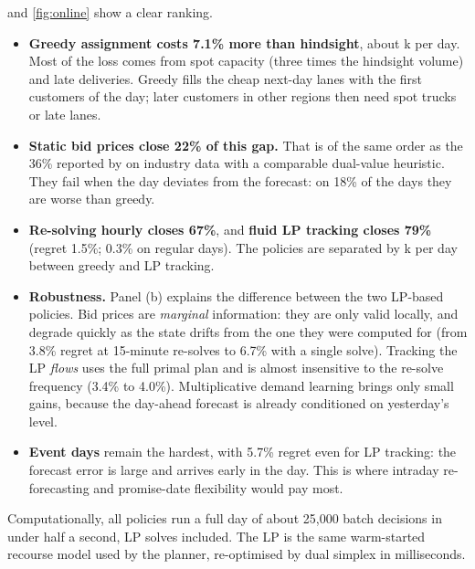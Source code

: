  and \cref{fig:online} show a clear ranking.
\begin{itemize}
  \item \textbf{Greedy assignment costs 7.1\% more than hindsight}, about k per day. Most of the loss comes from spot capacity (three times the hindsight volume) and late deliveries. Greedy fills the cheap next-day lanes with the first customers of the day; later customers in other regions then need spot trucks or late lanes.
  \item \textbf{Static bid prices close 22\% of this gap.} That is of the same order as the 36\% reported by \citet{acimovic2015} on industry data with a comparable dual-value heuristic. They fail when the day deviates from the forecast: on 18\% of the days they are worse than greedy.
  \item \textbf{Re-solving hourly closes 67\%}, and \textbf{fluid LP tracking closes 79\%} (regret 1.5\%; 0.3\% on regular days). The policies are separated by k per day between greedy and LP tracking.
  \item \textbf{Robustness.} Panel (b) explains the difference between the two LP-based policies. Bid prices are \emph{marginal} information: they are only valid locally, and degrade quickly as the state drifts from the one they were computed for (from 3.8\% regret at 15-minute re-solves to 6.7\% with a single solve). Tracking the LP \emph{flows} uses the full primal plan and is almost insensitive to the re-solve frequency (3.4\% to 4.0\%). Multiplicative demand learning brings only small gains, because the day-ahead forecast is already conditioned on yesterday's level.
  \item \textbf{Event days} remain the hardest, with 5.7\% regret even for LP tracking: the forecast error is large and arrives early in the day. This is where intraday re-forecasting and promise-date flexibility would pay most.
\end{itemize}
Computationally, all policies run a full day of about 25{,}000 batch decisions in under half a second, LP solves included. The LP is the same warm-started recourse model used by the planner, re-optimised by dual simplex in milliseconds.
